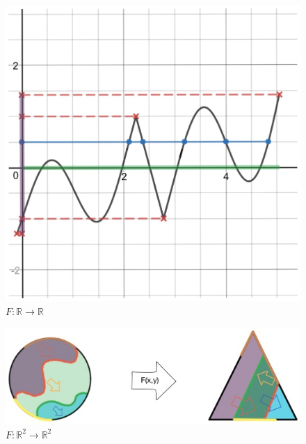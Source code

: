 \documentclass[11pt]{article}
\theoremstyle{plain}
\theoremstyle{definition}
\theoremstyle{remark}
\begin{document}
\begin{figure}[h] \label{fig1}
\begin{center}
\includegraphics[scale=0.15]{Figures/Curvea} 
\end{center}
\caption{$F:\mathbb{R}\rightarrow\mathbb{R}$}
\end{figure}
\begin{figure}[h] \label{fig2}
\begin{center}
\includegraphics[scale=0.5]{Figures/R2Exa}
\end{center}
\caption{$F:\mathbb{R}^2\rightarrow\mathbb{R}^2$}
\end{figure}
\end{document}
